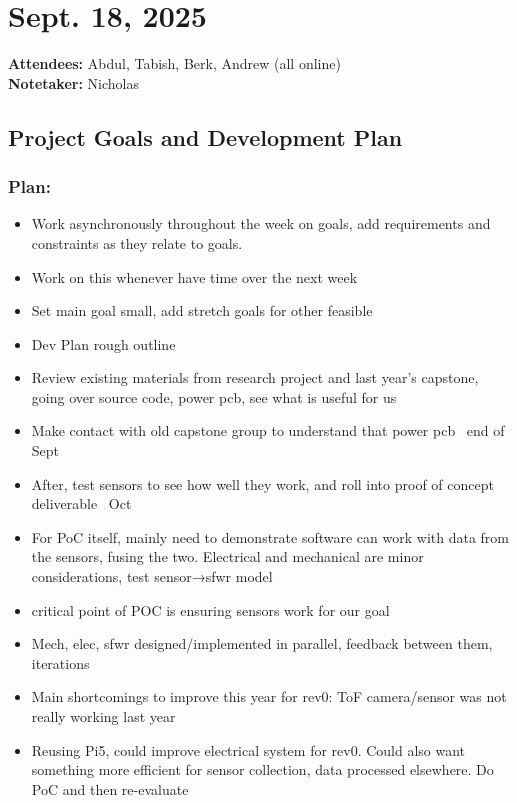 \pagebreak
	\section*{Sept. 18, 2025}
	\textbf{Attendees:} Abdul, Tabish, Berk, Andrew (all online) \\
	\textbf{Notetaker:} Nicholas	
		\subsection*{Project Goals and Development Plan}
			\subsubsection*{Plan:} 
				\begin{itemize}
					\item Work asynchronously throughout the week on goals, add requirements and constraints as they relate to goals.	 
					\item Work on this whenever have time over the next week 
					\item Set main goal small, add stretch goals for other feasible 
					\item Dev Plan rough outline 
					\item Review existing materials from research project and last year’s capstone, going over source code, power pcb, see what is useful for us 
					\item Make contact with old capstone group to understand that power pcb ~end of Sept 
					\item After, test sensors to see how well they work, and roll into proof of concept deliverable ~Oct 
					\item For PoC itself, mainly need to demonstrate software can work with data from the sensors, fusing the two. Electrical and mechanical are minor considerations, test sensor→sfwr model 
					\item critical point of POC is ensuring sensors work for our goal 
					\item Mech, elec, sfwr designed/implemented in parallel, feedback between them, iterations 
					\item Main shortcomings to improve this year for rev0: ToF camera/sensor was not really working last year 
					\item Reusing Pi5, could improve electrical system for rev0. Could also want something more efficient for sensor collection, data processed elsewhere. Do PoC and then re-evaluate 
				\end{itemize}

